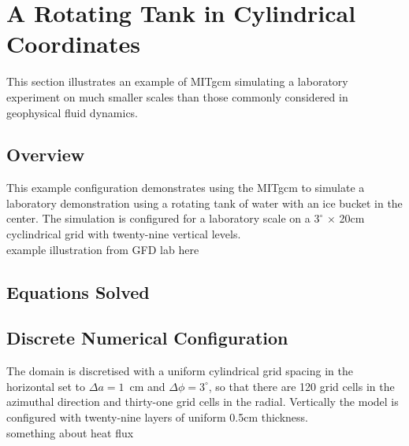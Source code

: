 

%
%

\section{A Rotating Tank in Cylindrical Coordinates}
\label{sect:eg-tank}
\label{www:tutorials}

This section illustrates an example of MITgcm simulating a laboratory
experiment on much smaller scales than those commonly considered in  
geophysical
fluid dynamics.

\subsection{Overview}
\label{www:tutorials}
                                                                                
                                                                                
This example configuration demonstrates using the MITgcm to simulate
a laboratory demonstration using a rotating tank of water with an ice
bucket in the center. The simulation is configured for a laboratory
scale on a
$3^{\circ}$ $\times$ 20cm
cyclindrical grid with twenty-nine vertical
levels.
\\
example illustration from GFD lab here
\\



 

\subsection{Equations Solved}
\label{www:tutorials}


\subsection{Discrete Numerical Configuration}
\label{www:tutorials}

 The domain is discretised with 
a uniform cylindrical grid spacing in the horizontal set to
 $\Delta a=1$~cm and $\Delta \phi=3^{\circ}$, so 
that there are 120 grid cells in the azimuthal direction and thirty-one grid cells in the radial. Vertically the 
model is configured with twenty-nine layers of uniform 0.5cm thickness.
\\
something about heat flux

